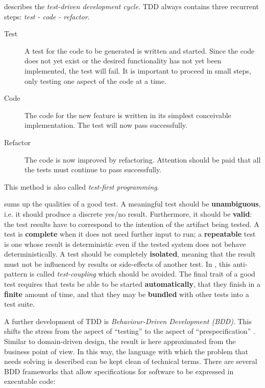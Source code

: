  describes the \textit{test-driven development cycle}. TDD always contains three recurrent steps: \textit{test - code - refactor}.

\begin{description}
  \item[Test] A test for the code to be generated is written and started. Since the code does not yet exist or the desired functionality has not yet been implemented, the test will fail. It is important to proceed in small steps, only testing one aspect of the code at a time.
  \item[Code] The code for the new feature is written in its simplest conceivable implementation. The test will now pass successfully.
  \item[Refactor] The code is now improved by refactoring. Attention should be paid that all the tests must continue to pass successfully.
\end{description}

This method is also called \textit{test-first programming}.

 sums up the qualities of a good test. A meaningful test should be \textbf{unambiguous}, i.e. it should produce a discrete yes/no result. Furthermore, it should be \textbf{valid}: the test results have to correspond to the intention of the artifact being tested. A test is \textbf{complete} when it does not need further input to run; a \textbf{repeatable} test is one whose result is deterministic even if the tested system does not behave deterministically. A test should be completely \textbf{isolated}, meaning that the result must not be influenced by results or side-effects of another test. In , this anti-pattern is called \textit{test-coupling} which should be avoided. The final trait of a good test requires that tests be able to be started \textbf{automatically}, that they finish in a \textbf{finite} amount of time, and that they may be \textbf{bundled} with other tests into a test suite.

A further development of TDD is \textit{Behaviour-Driven Development (BDD)}. This shifts the stress from the aspect of \enquote{testing} to the aspect of \enquote{prespecification} . Similar to domain-driven design, the result is here approximated from the business point of view. In this way, the language with which the problem that needs solving is described can be kept clean of technical terms. There are several BDD frameworks that allow specifications for software to be expressed in executable code:

